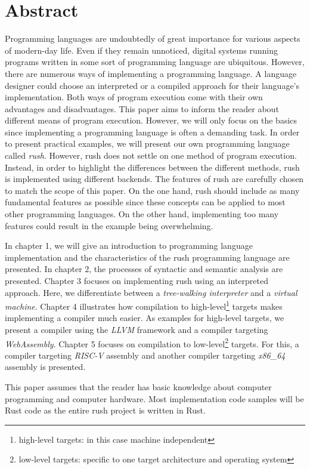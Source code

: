 \chapter*{Abstract}

Programming languages are undoubtedly of great importance for various aspects of
modern-day life. Even if they remain unnoticed, digital systems running programs
written in some sort of programming language are ubiquitous.
However, there are numerous ways of implementing a programming language.
A language designer could choose an interpreted or a compiled approach for their
language's implementation. Both ways of program execution come with their own
advantages and disadvantages.
\newline
This paper aims to inform the reader about different means of program execution.
However, we will only focus on the basics since implementing a programming language is often a demanding task.
In order to present practical examples, we will present our own programming language called \emph{rush}.
However, rush does not settle on one method of program execution. Instead, in
order to highlight the differences between the different methods, rush is implemented using different backends.
The features of rush are carefully chosen to match the scope of this paper.
On the one hand, rush should include as many fundamental features as possible since these concepts can be applied to most other programming languages.
On the other hand, implementing too many features could result in the example being overwhelming.

In chapter 1, we will give an introduction to programming language implementation
and the characteristics of the rush programming language are presented.
In chapter 2, the processes of syntactic and semantic analysis are presented.
Chapter 3 focuses on implementing rush using an interpreted approach.
Here, we differentiate between a \emph{tree-walking interpreter} and a \emph{virtual machine}.
Chapter 4 illustrates how compilation to high-level\footnote{high-level targets: in this case machine independent} targets makes implementing a compiler much easier.
As examples for high-level targets, we present a compiler using the \emph{LLVM} framework and a
compiler targeting \emph{WebAssembly}.
Chapter 5 focuses on compilation to low-level\footnote{low-level targets: specific to one target architecture and operating system} targets.
For this, a compiler targeting \emph{RISC-V} assembly and another compiler targeting \emph{x86\_64} assembly is presented.

This paper assumes that the reader has basic knowledge about computer programming and computer hardware.
Most implementation code samples will be Rust code as the entire rush project is written in Rust.
